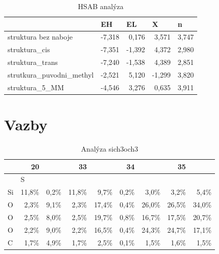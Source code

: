\documentclass[
  digital, %
  table,   %
  lof,     %
  lot,     %
  oneside,
]{fithesis3}
\begin{document}
\begin{table}[htbp]
\caption{HSAB analýza}
\begin{center}
\begin{tabular}{|l|r|r|r|r|}
\hline
 & \multicolumn{1}{l|}{EH} & \multicolumn{1}{l|}{EL} & \multicolumn{1}{l|}{X} & \multicolumn{1}{l|}{n} \\ \hline
struktura bez naboje & -7,318 & 0,176 & 3,571 & 3,747 \\ \hline
struktura\_cis & -7,351 & -1,392 & 4,372 & 2,980 \\ \hline
struktura\_trans & -7,240 & -1,538 & 4,389 & 2,851 \\ \hline
strutkura\_puvodni\_methyl & -2,521 & 5,120 & -1,299 & 3,820 \\ \hline
struktura\_5\_MM & -4,546 & 3,276 & 0,635 & 3,911 \\ \hline
\end{tabular}
\end{center}
\label{hsab_large}
\end{table}





\section{Vazby}
\begin{table}[htbp]
\caption{Analýza sich3och3}
\begin{center}
\begin{tabular}{|l|r|r|r|r|r|r|r|r|}
\hline
 & 20 & \multicolumn{1}{l|}{} & 33 & \multicolumn{1}{l|}{} & 34 & \multicolumn{1}{l|}{} & 35 & \multicolumn{1}{l|}{} \\ \hline
 & \multicolumn{1}{l|}{S} &  \\
Si & 11,8\% & 0,2\% & 11,8\% & 9,7\% & 0,2\% & 3,0\% & 3,2\% & 5,4\% \\ \hline
O & 2,3\% & 9,1\% & 2,3\% & 17,4\% & 0,4\% & 26,0\% & 26,5\% & 34,0\% \\ \hline
O & 2,5\% & 8,0\% & 2,5\% & 19,7\% & 0,8\% & 16,7\% & 17,5\% & 20,7\% \\ \hline
O & 2,2\% & 9,0\% & 2,2\% & 16,5\% & 0,4\% & 24,3\% & 24,7\% & 17,1\% \\ \hline
C & 1,7\% & 4,9\% & 1,7\% & 2,5\% & 0,1\% & 1,5\% & 1,6\% & 1,5\% \\ \hline
\end{tabular}
\end{center}
\label{si_ch3_och3_MPA}
\end{table}
\end{document}
